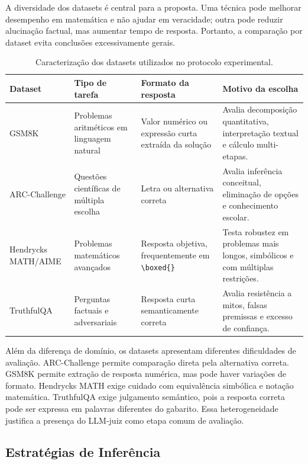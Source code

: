 \documentclass[12pt]{article}
\begin{document}
A diversidade dos datasets é central para a proposta. Uma técnica pode melhorar desempenho em matemática e não ajudar em veracidade; outra pode reduzir alucinação factual, mas aumentar tempo de resposta. Portanto, a comparação por dataset evita conclusões excessivamente gerais.

\begin{table}[ht]
\centering
\small
\caption{Caracterização dos datasets utilizados no protocolo experimental.}
\label{tab:datasets}
\begin{tabular}{|p{2.6cm}|p{3.1cm}|p{3.3cm}|p{3.4cm}|}
\hline
\textbf{Dataset} & \textbf{Tipo de tarefa} & \textbf{Formato da resposta} & \textbf{Motivo da escolha} \\
\hline
GSM8K & Problemas aritméticos em linguagem natural & Valor numérico ou expressão curta extraída da solução & Avalia decomposição quantitativa, interpretação textual e cálculo multi-etapas. \\
\hline
ARC-Challenge & Questões científicas de múltipla escolha & Letra ou alternativa correta & Avalia inferência conceitual, eliminação de opções e conhecimento escolar. \\
\hline
Hendrycks MATH/AIME & Problemas matemáticos avançados & Resposta objetiva, frequentemente em \texttt{\textbackslash boxed\{\}} & Testa robustez em problemas mais longos, simbólicos e com múltiplas restrições. \\
\hline
TruthfulQA & Perguntas factuais e adversariais & Resposta curta semanticamente correta & Avalia resistência a mitos, falsas premissas e excesso de confiança. \\
\hline
\end{tabular}
\end{table}

Além da diferença de domínio, os datasets apresentam diferentes dificuldades de avaliação. ARC-Challenge permite comparação direta pela alternativa correta. GSM8K permite extração de resposta numérica, mas pode haver variações de formato. Hendrycks MATH exige cuidado com equivalência simbólica e notação matemática. TruthfulQA exige julgamento semântico, pois a resposta correta pode ser expressa em palavras diferentes do gabarito. Essa heterogeneidade justifica a presença do LLM-juiz como etapa comum de avaliação.

\subsection{Estratégias de Inferência}
\end{document}
